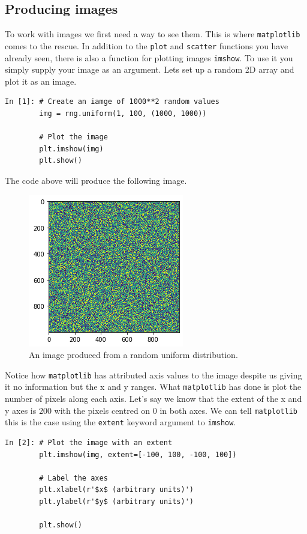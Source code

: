 \subsection{Producing images}

To work with images we first need a way to see them. This is where \texttt{matplotlib} comes to the rescue. In addition to the \texttt{plot} and \texttt{scatter} functions you have already seen, there is also a function for plotting images \texttt{imshow}. To use it you simply supply your image as an argument. Lets set up a random 2D array and plot it as an image.

\begin{lstlisting}[style=PY]
In [1]: # Create an iamge of 1000**2 random values
        img = rng.uniform(1, 100, (1000, 1000))
        
        # Plot the image
        plt.imshow(img)
        plt.show()
\end{lstlisting}

The code above will produce the following image.

\begin{figure}[H]
	\centering
	\includegraphics[scale=0.7]{Pictures/randomimgexample.png}
\caption{An image produced from a random uniform distribution.}
\label{fig:randomimg}
\end{figure}

Notice how \texttt{matplotlib} has attributed axis values to the image despite us giving it no information but the x and y ranges. What \texttt{matplotlib} has done is plot the number of pixels along each axis. Let's say we know that the extent of the x and y axes is 200 with the pixels centred on 0 in both axes. We can tell \texttt{matplotlib} this is the case using the \texttt{extent} keyword argument to \texttt{imshow}. 

\newpage

\begin{lstlisting}[style=PY]
In [2]: # Plot the image with an extent
        plt.imshow(img, extent=[-100, 100, -100, 100])

        # Label the axes
        plt.xlabel(r'$x$ (arbitrary units)')
        plt.ylabel(r'$y$ (arbitrary units)')
    
        plt.show()
\end{lstlisting}

